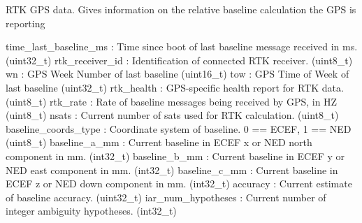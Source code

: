 \begin{DoxyVerb}
\begin{DoxyVerb}
\begin{DoxyVerb}RTK GPS data. Gives information on the relative baseline calculation
the GPS is reporting

time_last_baseline_ms        : Time since boot of last baseline message received in ms. (uint32_t)
rtk_receiver_id           : Identification of connected RTK receiver. (uint8_t)
wn                        : GPS Week Number of last baseline (uint16_t)
tow                       : GPS Time of Week of last baseline (uint32_t)
rtk_health                : GPS-specific health report for RTK data. (uint8_t)
rtk_rate                  : Rate of baseline messages being received by GPS, in HZ (uint8_t)
nsats                     : Current number of sats used for RTK calculation. (uint8_t)
baseline_coords_type        : Coordinate system of baseline. 0 == ECEF, 1 == NED (uint8_t)
baseline_a_mm             : Current baseline in ECEF x or NED north component in mm. (int32_t)
baseline_b_mm             : Current baseline in ECEF y or NED east component in mm. (int32_t)
baseline_c_mm             : Current baseline in ECEF z or NED down component in mm. (int32_t)
accuracy                  : Current estimate of baseline accuracy. (uint32_t)
iar_num_hypotheses        : Current number of integer ambiguity hypotheses. (int32_t)\end{DoxyVerb}
 \mbox{\label{classpymavlink_1_1dialects_1_1v10_1_1MAVLink_a380984eae38391d62d424fcaed6ea094}} 

\end{DoxyVerb}
\end{DoxyVerb}
